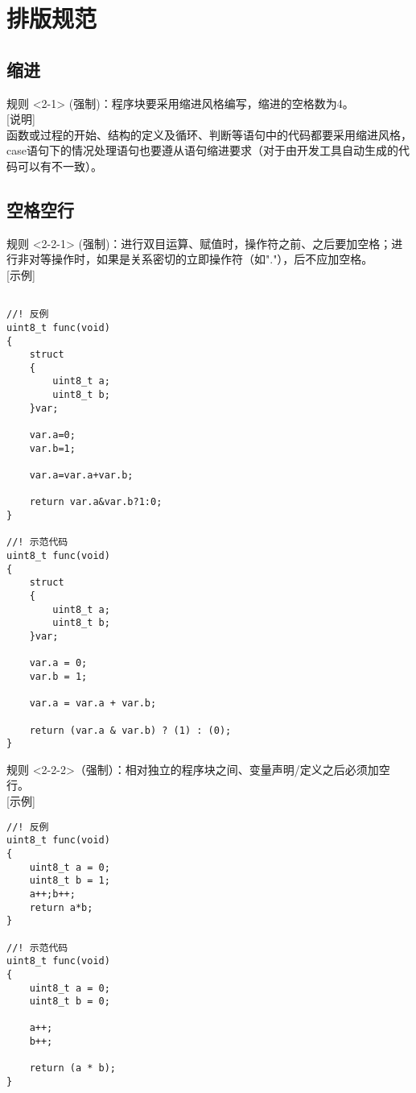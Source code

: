 \section{排版规范}
\subsection{缩进}
规则 <2-1> (强制)：程序块要采用缩进风格编写，缩进的空格数为4。\\

[说明]\\
函数或过程的开始、结构的定义及循环、判断等语句中的代码都要采用缩进风格，case语句下的情况处理语句也要遵从语句缩进要求（对于由开发工具自动生成的代码可以有不一致）。\\

\subsection{空格空行}
规则 <2-2-1> (强制)：进行双目运算、赋值时，操作符之前、之后要加空格；进行非对等操作时，如果是关系密切的立即操作符（如"."），后不应加空格。\\

[示例]\\
\begin{lstlisting}

//! 反例
uint8_t func(void)
{
	struct
	{
		uint8_t a;
		uint8_t b;
	}var;
	
	var.a=0;
	var.b=1;
	
	var.a=var.a+var.b;
	
	return var.a&var.b?1:0;
}

//! 示范代码
uint8_t func(void)
{
	struct
	{
		uint8_t a;
		uint8_t b;
	}var;
	
	var.a = 0;
	var.b = 1;
	
	var.a = var.a + var.b;
	
	return (var.a & var.b) ? (1) : (0);
}
\end{lstlisting}
规则 <2-2-2>（强制）：相对独立的程序块之间、变量声明/定义之后必须加空行。\\

[示例]\\
\begin{lstlisting}
//! 反例
uint8_t func(void)
{
	uint8_t a = 0;
	uint8_t b = 1;
	a++;b++;
	return a*b;
}

//! 示范代码
uint8_t func(void)
{
	uint8_t a = 0;
	uint8_t b = 0;
	
	a++;
	b++;
	
	return (a * b);
}
\end{lstlisting}

